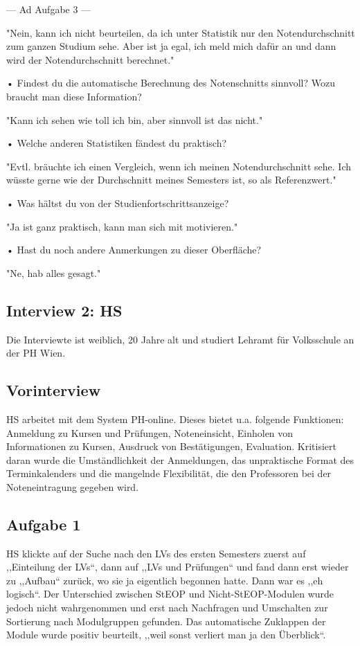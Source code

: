 \documentclass[a4paper,10pt]{scrartcl}
\begin{document}
---
Ad Aufgabe 3
---

"Nein, kann ich nicht beurteilen, da ich unter Statistik nur den Notendurchschnitt zum ganzen Studium sehe. Aber ist ja egal, ich meld mich dafür an und dann wird der Notendurchschnitt berechnet."

• Findest du die automatische Berechnung des Notenschnitts sinnvoll? Wozu braucht
man diese Information?

"Kann ich sehen wie toll ich bin, aber sinnvoll ist das nicht."


• Welche anderen Statistiken fändest du praktisch?

"Evtl. bräuchte ich einen Vergleich, wenn ich meinen Notendurchschnitt sehe. Ich wüsste gerne wie der Durchschnitt meines Semesters ist, so als Referenzwert."


• Was hältst du von der Studienfortschrittsanzeige?

"Ja ist ganz praktisch, kann man sich mit motivieren."


• Hast du noch andere Anmerkungen zu dieser Oberfläche? 

"Ne, hab alles gesagt."

\subsection{Interview 2: HS}

Die Interviewte ist weiblich, 20 Jahre alt und studiert Lehramt für Volksschule an der PH Wien.

\subsection*{Vorinterview}

HS arbeitet mit dem System PH-online. Dieses bietet u.a. folgende Funktionen: Anmeldung zu Kursen und Prüfungen, Noteneinsicht, Einholen von Informationen zu Kursen, Ausdruck von Bestätigungen, Evaluation. Kritisiert daran wurde die Umständlichkeit der Anmeldungen, das unpraktische Format des Terminkalenders und die mangelnde Flexibilität, die den Professoren bei der Noteneintragung gegeben wird.

\subsection*{Aufgabe 1}

HS klickte auf der Suche nach den LVs des ersten Semesters zuerst auf ,,Einteilung der LVs``, dann auf ,,LVs und Prüfungen`` und fand dann erst wieder zu ,,Aufbau`` zurück, wo sie ja eigentlich begonnen hatte. Dann war es ,,eh logisch``. Der Unterschied zwischen StEOP und Nicht-StEOP-Modulen wurde jedoch nicht wahrgenommen und erst nach Nachfragen und Umschalten zur Sortierung nach Modulgruppen gefunden. Das automatische Zuklappen der Module wurde positiv beurteilt, ,,weil sonst verliert man ja den Überblick``.
\end{document}
